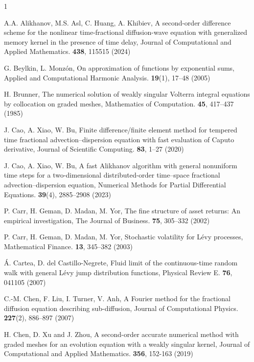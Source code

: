 \documentclass[10pt, reqno]{amsart}
\theoremstyle{remark}
\theoremstyle{definition}
\numberwithin{table}{section}
\begin{document}
\begin{thebibliography}{1}

A.A. Alikhanov, M.S. Asl, C. Huang, A. Khibiev, A second-order difference scheme for the nonlinear time-fractional diffusion-wave equation with generalized memory kernel in the presence of time delay, Journal of Computational and Applied Mathematics. \textbf{438}, 115515 (2024)

G. Beylkin, L. Monzón, On approximation of functions by exponential sums, Applied and Computational Harmonic Analysis. \textbf{19}(1), 17--48 (2005)

H. Brunner, The numerical solution of weakly singular Volterra integral equations by collocation on graded meshes, Mathematics of Computation. \textbf{45}, 417--437 (1985)

J. Cao, A. Xiao, W. Bu, Finite difference/finite element method for tempered time fractional advection–dispersion equation with fast evaluation of Caputo derivative, Journal of Scientific Computing. \textbf{83}, 1--27 (2020)

J. Cao, A. Xiao, W. Bu, A fast Alikhanov algorithm with general nonuniform time steps for a two-dimensional distributed-order time–space fractional advection–dispersion equation, Numerical Methods for Partial Differential Equations. \textbf{39}(4), 2885--2908 (2023)

P. Carr, H. Geman, D. Madan, M. Yor, The fine structure of asset returns: An empirical investigation, The Journal of Business. \textbf{75}, 305--332 (2002)

P. Carr, H. Geman, D. Madan, M. Yor, Stochastic volatility for Lévy processes, Mathematical Finance. \textbf{13}, 345--382 (2003)

Á. Cartea, D. del Castillo-Negrete, Fluid limit of the continuous-time random walk with general Lévy jump distribution functions, Physical Review E. \textbf{76}, 041105 (2007)

C.-M. Chen, F. Liu, I. Turner, V. Anh, A Fourier method for the fractional diffusion equation describing sub-diffusion, Journal of Computational Physics. \textbf{227}(2), 886--897 (2007)

H. Chen, D. Xu and J. Zhou, A second-order accurate numerical method with graded meshes for an evolution equation with a weakly singular kernel, Journal of Computational and Applied Mathematics. \textbf{356}, 152-163 (2019)


\end{thebibliography}
\end{document}

